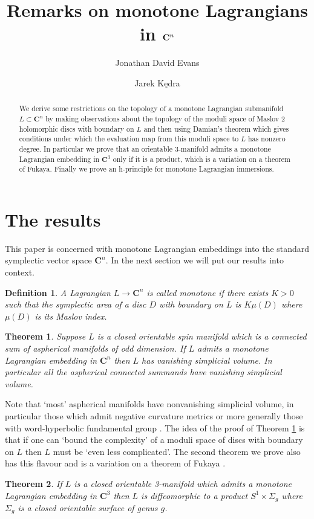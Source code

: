 \documentclass{amsart}
\title{Remarks on monotone Lagrangians in $\CC^n$}
\author{Jonathan David Evans}
\author{Jarek K\k{e}dra}
\newcommand{\CC}{\mathbf{C}}
\newtheorem{dfn}[thm]{Definition}
\newtheorem{thmmain}{Theorem}
\begin{document}
\begin{abstract}
We derive some restrictions on the topology of a monotone Lagrangian submanifold $L\subset\CC^n$ by making observations about the topology of the moduli space of Maslov 2 holomorphic discs with boundary on $L$ and then using Damian's theorem which gives conditions under which the evaluation map from this moduli space to $L$ has nonzero degree. In particular we prove that an orientable 3-manifold admits a monotone Lagrangian embedding in $\CC^3$ only if it is a product, which is a variation on a theorem of Fukaya. Finally we prove an h-principle for monotone Lagrangian immersions.
\end{abstract}
\maketitle
\section{The results}
This paper is concerned with monotone Lagrangian embeddings into the standard symplectic vector space $\CC^n$. In the next section we will put our results into context.
\begin{dfn}\label{mono}
A Lagrangian $L\rightarrow\CC^n$ is called \emph{monotone} if there exists $K>0$ such that the symplectic area of a disc $D$ with boundary on $L$ is $K\mu(D)$ where $\mu(D)$ is its Maslov index.
\end{dfn}
\begin{thmmain}\label{simpvol}
Suppose $L$ is a closed orientable spin manifold which is a connected
sum of aspherical manifolds of odd dimension. If $L$ admits a monotone Lagrangian
embedding in $\CC^n$ then $L$ has vanishing simplicial volume. In particular all the
aspherical connected summands have vanishing simplicial volume.
\end{thmmain}
Note that `most' aspherical manifolds have nonvanishing simplicial volume, in particular those which admit negative curvature metrics \cite{GroVol} or more generally those with word-hyperbolic fundamental group \cite{Min}. The idea of the proof of Theorem \ref{simpvol} is that if one can `bound the complexity' of a moduli space of discs with boundary on $L$ then $L$ must be `even less complicated'. The second theorem we prove also has this flavour and is a variation on a theorem of Fukaya \cite{Fuk}.
\begin{thmmain}\label{fukimp}
If $L$ is a closed orientable 3-manifold which admits a monotone Lagrangian embedding in $\CC^3$ then $L$ is diffeomorphic to a product $S^1\times\Sigma_g$ where $\Sigma_g$ is a closed orientable surface of genus $g$.
\end{thmmain}
\end{document}
